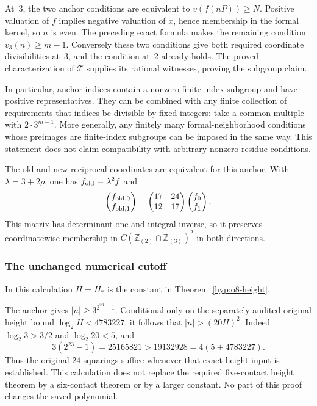 \documentclass[11pt]{article}
\theoremstyle{definition}
\theoremstyle{remark}
\begin{document}
At~$3$, the two anchor conditions are equivalent to
$v(f(nP))\ge N$. Positive valuation of $f$ implies negative valuation
of $x$, hence membership in the formal kernel, so $n$ is even.
The preceding exact formula makes the remaining condition
$v_3(n)\ge m-1$. Conversely these two conditions give both required
coordinate divisibilities at~$3$, and the condition at~$2$ already
holds. The proved characterization of $\mathcal T$ supplies its
rational witnesses, proving the subgroup claim.

In particular, anchor indices contain a nonzero finite-index subgroup
and have positive representatives. They can be combined with any
finite collection of requirements that indices be divisible by fixed
integers: take a common multiple with $2\cdot3^{m-1}$. More generally,
any finitely many formal-neighborhood conditions whose preimages are
finite-index subgroups can be imposed in the same way. This statement
does not claim compatibility with arbitrary nonzero residue conditions.

The old and new reciprocal coordinates are equivalent for this anchor.
With $\lambda=3+2\rho$, one has $f_{\rm old}=\lambda^2f$ and
\[
 \begin{pmatrix}f_{{\rm old},0}\\f_{{\rm old},1}\end{pmatrix}
 =\begin{pmatrix}17&24\\12&17\end{pmatrix}
 \begin{pmatrix}f_0\\f_1\end{pmatrix}.
\]
This matrix has determinant one and integral inverse, so it preserves
coordinatewise membership in
$C(\mathbb Z_{(2)}\cap\mathbb Z_{(3)})^2$ in both directions.

\subsubsection{The unchanged numerical cutoff}\label{subsec:o8-anchor-cutoff}
In this calculation $H=H_*$ is the constant in Theorem~\ref{hyp:o8-height}.

The anchor gives $|n|\ge3^{2^{23}-1}$. Conditional only on the separately
audited original height bound $\log_2H<4783227$, it follows that
$|n|>(20H)^2$. Indeed $\log_2 3>3/2$ and $\log_2 20<5$, and
\[
 3(2^{23}-1)=25165821
 >19132928=4(5+4783227).
\]
Thus the original $24$ squarings suffice whenever that exact height
input is established. This calculation does not replace the required
five-contact height theorem by a six-contact theorem or by a larger
constant. No part of this proof changes the saved polynomial.
\end{document}
